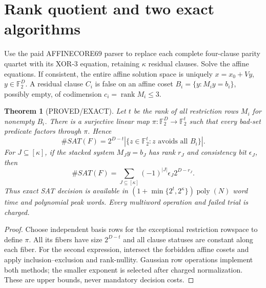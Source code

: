 \documentclass[11pt]{article}
\newtheorem{theorem}{Theorem}
\begin{document}
\section{Rank quotient and two exact algorithms}
Use the paid AFFINECORE69 parser to replace each complete four-clause parity quartet with its XOR-3 equation, retaining $\kappa$ residual clauses. Solve the affine equations. If consistent, the entire affine solution space is uniquely $x=x_0+Vy$, $y\in\mathbb F_2^D$. A residual clause $C_i$ is false on an affine coset $B_i=\{y:M_i y=b_i\}$, possibly empty, of codimension $c_i=\operatorname{rank}M_i\le3$.
\begin{theorem}[PROVED/EXACT]
Let $t$ be the rank of all restriction rows $M_i$ for nonempty $B_i$. There is a surjective linear map $\pi:\mathbb F_2^D\to\mathbb F_2^t$ such that every bad-set predicate factors through $\pi$. Hence
\[
\#SAT(F)=2^{D-t}|\{z\in\mathbb F_2^t:z\text{ avoids all }B_i\}|.
\]
For $J\subseteq[\kappa]$, if the stacked system $M_Jy=b_J$ has rank $r_J$ and consistency bit $\epsilon_J$, then
\[
\#SAT(F)=\sum_{J\subseteq[\kappa]}(-1)^{|J|}\epsilon_J2^{D-r_J}.
\]
Thus exact SAT decision is available in $(1+\min\{2^t,2^\kappa\})\operatorname{poly}(N)$ word time and polynomial peak words. Every multiword operation and failed trial is charged.
\end{theorem}
\begin{proof}
Choose independent basis rows for the exceptional restriction rowspace to define $\pi$. All its fibers have size $2^{D-t}$ and all clause statuses are constant along each fiber. For the second expression, intersect the forbidden affine cosets and apply inclusion--exclusion and rank-nullity. Gaussian row operations implement both methods; the smaller exponent is selected after charged normalization. These are upper bounds, never mandatory decision costs.
\end{proof}
\end{document}
